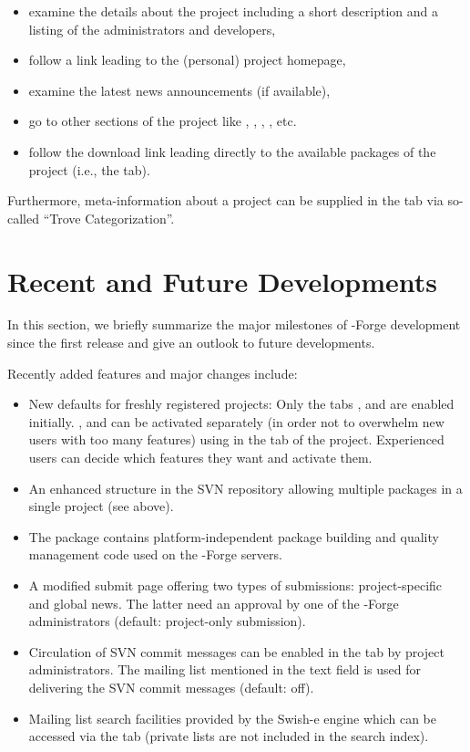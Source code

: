 \begin{itemize}
\item examine the details about the project including a short
  description and a listing of the administrators and developers,
\item follow a link leading to the (personal) project homepage,
\item examine the latest news announcements (if available),
\item go to other sections of the project like
  , ,
   , , etc.
\item follow the download link leading directly to the available
  packages of the project (i.e., the  tab).
\end{itemize}

Furthermore, meta-information about a project can be supplied in
the  tab via so-called ``Trove Categorization''. 


\section*{Recent and Future Developments}

In this section, we briefly summarize the major milestones of
\R{}-Forge development since the first release and give an outlook to
future developments.

Recently added features and major changes include:

\begin{itemize}
\item New defaults for freshly registered projects: Only the tabs
  ,  and  are enabled
  initially. ,  and 
  can be activated separately (in order not to overwhelm
  new users with too many features) using  in
  the  tab of the project. Experienced users can decide
  which features they want and activate them.
\item An enhanced structure in the SVN repository allowing multiple
  packages in a single project (see above).
\item The \R{} package  \citep{forge:theussl:2008}
  contains platform-independent package
  building and quality management code used on the \R{}-Forge servers.
\item A modified  submit page offering two types of
  submissions: project-specific and global news. The latter
  need an approval by one of the \R{}-Forge administrators (default:
  project-only submission).
\item Circulation of SVN commit messages can be enabled in the
   tab by project administrators. The mailing list mentioned in
  the text field is used for delivering the SVN commit messages
  (default: off). 
\item Mailing list search facilities provided by the Swish-e engine
  which can be accessed via the  tab (private lists
  are not included in the search index).

\end{itemize}

